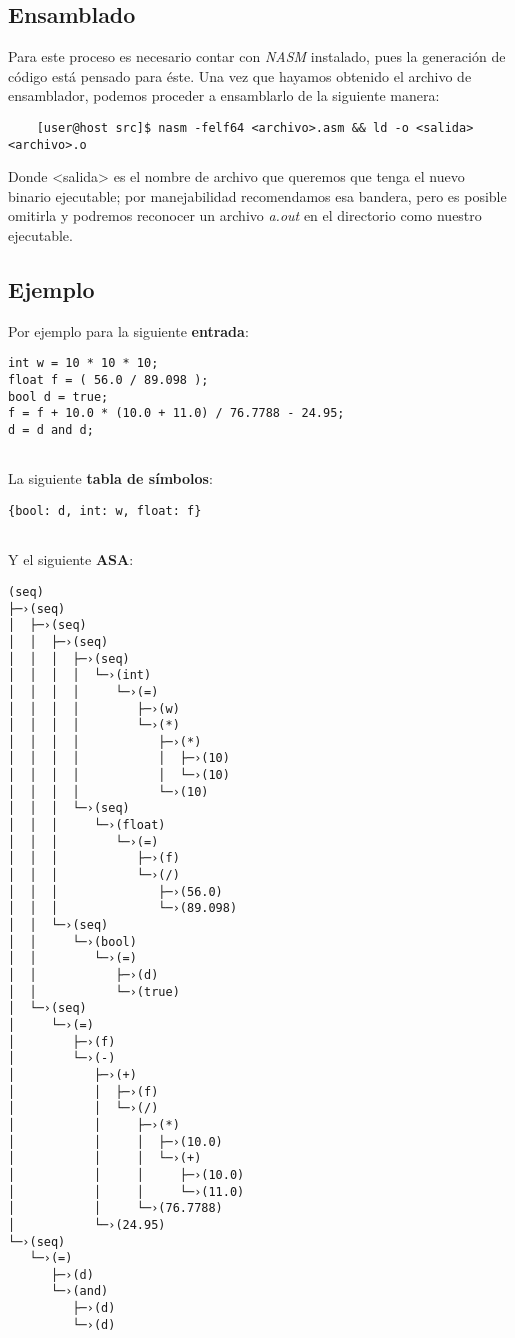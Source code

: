 \documentclass[12pt]{article}
\begin{document}
\subsection{Ensamblado}
Para este proceso es necesario contar con \textit{NASM} instalado, pues la generación de código está
pensado para éste.
Una vez que hayamos obtenido el archivo de ensamblador, podemos proceder a ensamblarlo de la siguiente
manera:
\begin{verbatim}
    [user@host src]$ nasm -felf64 <archivo>.asm && ld -o <salida> <archivo>.o 
\end{verbatim}
Donde <salida> es el nombre de archivo que queremos que tenga el nuevo binario ejecutable;
por manejabilidad recomendamos esa bandera, pero es posible omitirla y podremos reconocer un
archivo \textit{a.out} en el directorio como nuestro ejecutable.


\subsection{Ejemplo}
Por ejemplo para la siguiente \textbf{entrada}:
\begin{verbatim}
int w = 10 * 10 * 10;
float f = ( 56.0 / 89.098 );
bool d = true;
f = f + 10.0 * (10.0 + 11.0) / 76.7788 - 24.95;
d = d and d;


\end{verbatim}
La siguiente \textbf{tabla de símbolos}:
\begin{verbatim}
{bool: d, int: w, float: f}


\end{verbatim}
Y el siguiente \textbf{ASA}:
\begin{verbatim}
(seq)
├─›(seq)
│  ├─›(seq)
│  │  ├─›(seq)
│  │  │  ├─›(seq)
│  │  │  │  └─›(int)
│  │  │  │     └─›(=)
│  │  │  │        ├─›(w)
│  │  │  │        └─›(*)
│  │  │  │           ├─›(*)
│  │  │  │           │  ├─›(10)
│  │  │  │           │  └─›(10)
│  │  │  │           └─›(10)
│  │  │  └─›(seq)
│  │  │     └─›(float)
│  │  │        └─›(=)
│  │  │           ├─›(f)
│  │  │           └─›(/)
│  │  │              ├─›(56.0)
│  │  │              └─›(89.098)
│  │  └─›(seq)
│  │     └─›(bool)
│  │        └─›(=)
│  │           ├─›(d)
│  │           └─›(true)
│  └─›(seq)
│     └─›(=)
│        ├─›(f)
│        └─›(-)
│           ├─›(+)
│           │  ├─›(f)
│           │  └─›(/)
│           │     ├─›(*)
│           │     │  ├─›(10.0)
│           │     │  └─›(+)
│           │     │     ├─›(10.0)
│           │     │     └─›(11.0)
│           │     └─›(76.7788)
│           └─›(24.95)
└─›(seq)
   └─›(=)
      ├─›(d)
      └─›(and)
         ├─›(d)
         └─›(d)

\end{verbatim}
\end{document}
